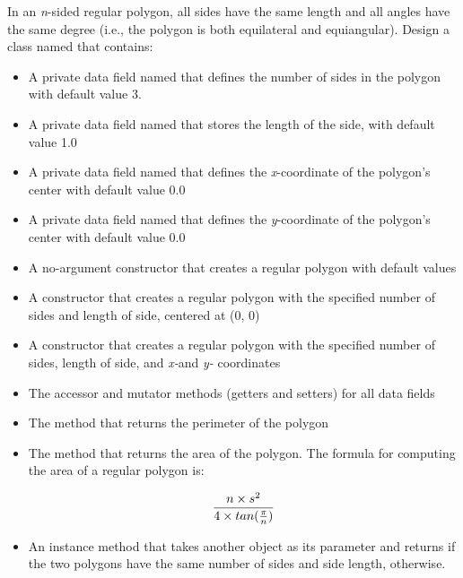 \begin{exercise}

In an {\em n}-sided regular polygon, all sides have the same length and all angles have the same degree (i.e., the polygon is both equilateral and equiangular). Design a class named  that contains:
\begin{itemize}
    \item A private  data field named  that defines the number of sides in the polygon with default value 3.
    \item A private  data field named  that stores the length of the side, with default value 1.0
    \item A private  data field named  that defines the {\em x}-coordinate of the polygon's center with default value 0.0
    \item A private  data field named  that defines the {\em y}-coordinate of the polygon's center with default value 0.0
    \item A no-argument constructor that creates a regular polygon with default values
    \item A constructor that creates a regular polygon with the specified number of sides and length of side, centered at (0, 0)
    \item A constructor that creates a regular polygon with the specified number of sides, length of side, and {\em x-}and {\em y-} coordinates
    \item The accessor and mutator methods (getters and setters) for all data fields
    \item The method  that returns the perimeter of the polygon
    \item The method  that returns the area of the polygon. The formula for computing the area of a regular polygon is:
    
    \begin{equation*}
    {{n \times s^2} \over {4 \times tan({\pi \over n})}}
    \end{equation*}
    \item An  instance method that takes another  object as its parameter and returns  if the two polygons have the same number of sides and side length,  otherwise.
    
\end{itemize}


\end{exercise}
